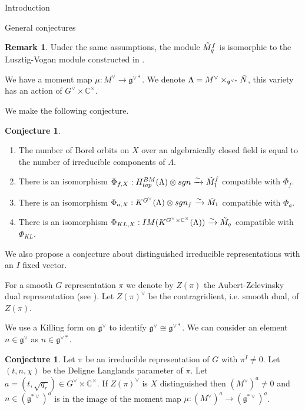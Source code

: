 \documentclass[12pt]{article}
\newcommand{\C}{\mathbb{C}}
\newcommand{\<}{\langle}
\renewcommand{\>}{\rangle}
\theoremstyle{plain}
\theoremstyle{definition}
\newtheorem{conj}[theorem]{Conjecture}
\newtheorem{Remark}[theorem]{Remark}
\begin{document}
\begin{section}{Introduction}
\begin{subsection}{General conjectures}
\begin{Remark}
    Under the same assumptions, the module $\Tilde{M}^f_q$ is isomorphic to the Lusztig-Vogan module constructed in \cite{Lusztig1983}.
\end{Remark}

 We have a moment map $\mu:M^\vee\rightarrow \mathfrak{g}^{\vee*}$. We denote $\Lambda=M^\vee\times_{\mathfrak{g}^{\vee*}}\Tilde{N}$, this variety has an action of $G^\vee\times\C^\times$.

We make the following conjecture.

\begin{conj}
\begin{enumerate}
        \item The number of Borel orbits on $X$ over an algebraically closed field is equal to the number of irreducible components of $\Lambda$.
    
    \item There is an isomorphism $\Phi_{f,X}:H^{BM}_{top}(\Lambda) \otimes sgn\xrightarrow{\sim} \Tilde{M}^f_1$ compatible with $\Phi_f$.
    
    \item There is an isomorphism $\Phi_{a,X}:K^{G^\vee}(\Lambda) \otimes sgn_f\xrightarrow{\sim} \Tilde{M}_1$ compatible with $\Phi_a$. 

    
    \item 
    
    There is an isomorphism $\Phi_{KL,X}:IM(K^{G^\vee\times\mathbb{C}^\times}(\Lambda))\xrightarrow{\sim} \Tilde{M}_q$ compatible with $\Phi_{KL}$. 
\end{enumerate}
\end{conj}

We also propose a conjecture about distinguished irreducible representations with an $I$ fixed vector.

For a smooth $G$ representation $\pi$ we denote by $Z(\pi)$ the Aubert-Zelevinsky dual representation (see \cite{Aubert}). Let $Z(\pi)^\vee$ be the contragridient, i.e. smooth dual, of $Z(\pi)$.

We use a Killing form on $\mathfrak{g}^\vee$ to identify $\mathfrak{g}^\vee\cong \mathfrak{g}^{\vee*}$. We can consider an element $n\in \mathfrak{g}^\vee$ as $n\in\mathfrak{g}^{\vee*}$.

\begin{conj}
    Let $\pi$ be an irreducible representation of $G$ with $\pi^I\neq 0$. Let $(t,n,\chi)$ be the Deligne Langlands parameter of $\pi$. Let $a=(t,\sqrt{q_r})\in G^\vee\times\C^\times$. If $Z(\pi)^\vee$ is $X$ distinguished then $(M^\vee)^a\neq 0$ and $n\in (\mathfrak{g}^{*\vee})^a$ is in the image of the moment map $\mu:(M^\vee)^a\rightarrow (\mathfrak{g}^{*\vee})^a$. 
\end{conj}


\end{subsection}
\end{section}
\end{document}
